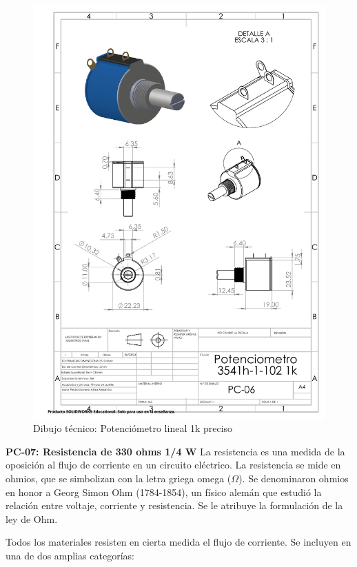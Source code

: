     \begin{figure}[H]
        \centering
        \includegraphics[trim = {7mm 1mm 1mm 1mm},clip,scale=0.4]{22/Img/potenciometroDibujo.PDF}
        \caption{Dibujo técnico: Potenciómetro lineal 1k preciso}
        \label{fig:potenciometro}
    \end{figure}
    
    
    \textbf{PC-07: Resistencia de 330 ohms 1/4 W }
    La resistencia es una medida de la oposición al flujo de corriente en un circuito eléctrico. La resistencia se mide en ohmios, que se simbolizan con la letra griega omega ($\Omega$). Se denominaron ohmios en honor a Georg Simon Ohm (1784-1854), un físico alemán que estudió la relación entre voltaje, corriente y resistencia. Se le atribuye la formulación de la ley de Ohm.
    
    
    Todos los materiales resisten en cierta medida el flujo de corriente. Se incluyen en una de dos amplias categorías:
    
